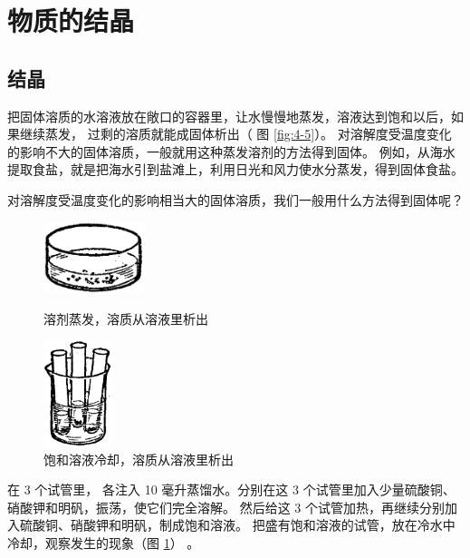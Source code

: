 \section{物质的结晶}\label{sec:4-4}

\subsection{结晶}

把固体溶质的水溶液放在敞口的容器里，让水慢慢地蒸发，溶液达到饱和以后，如果继续蒸发，
过剩的溶质就能成固体析出（ 图 \ref{fig:4-5}）。
对溶解度受温度变化的影响不大的固体溶质，一般就用这种蒸发溶剂的方法得到固体。
例如，从海水提取食盐，就是把海水引到盐滩上，利用日光和风力使水分蒸发，得到固体食盐。

对溶解度受温度变化的影响相当大的固体溶质，我们一般用什么方法得到固体呢？

\begin{figure}[htbp]
    \centering
    \begin{minipage}[b]{7cm}
        \centering
        \includegraphics[width=3cm]{../pic/czhx1-ch4-5}
    \caption{溶剂蒸发，溶质从溶液里析出}\label{fig:4-5}
    \end{minipage}
    \qquad
    \begin{minipage}[b]{7cm}
        \centering
        \includegraphics[width=2cm]{../pic/czhx1-ch4-6}
        \caption{饱和溶液冷却，溶质从溶液里析出}\label{fig:4-6}
    \end{minipage}
\end{figure}


\begin{shiyan}\label{shiyan:4-7}
    在 3 个试管里， 各注入 10 毫升蒸馏水。分别在这 3 个试管里加入少量硫酸铜、硝酸钾和明矾，振荡，使它们完全溶解。
    然后给这 3 个试管加热，再继续分别加入硫酸铜、硝酸钾和明矾，制成饱和溶液。
    把盛有饱和溶液的试管，放在冷水中冷却，观察发生的现象（图 \ref{fig:4-6}） 。
\end{shiyan}

